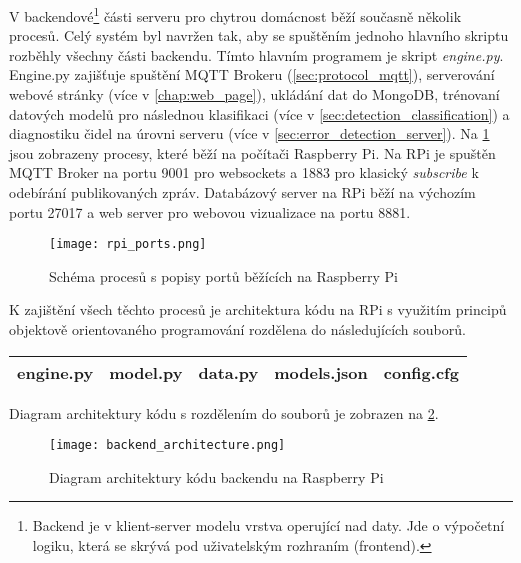 V backendové\footnote{Backend je v klient-server modelu vrstva operující nad daty. Jde o výpočetní logiku, která se skrývá pod uživatelským rozhraním (frontend).} části serveru pro chytrou domácnost běží současně několik procesů. Celý systém byl navržen tak, aby se spuštěním jednoho hlavního skriptu rozběhly všechny části backendu. Tímto hlavním programem je skript \textit{engine.py}. Engine.py zajišťuje spuštění MQTT Brokeru (\cref{sec:protocol_mqtt}), serverování webové stránky (více v \cref{chap:web_page}), ukládání dat do MongoDB, trénovaní datových modelů pro následnou klasifikaci (více v \cref{sec:detection_classification}) a diagnostiku čidel na úrovni serveru (více v \cref{sec:error_detection_server}).  Na \cref{fig:rpi_ports} jsou zobrazeny procesy, které běží na počítači Raspberry Pi. Na RPi je spuštěn MQTT Broker na portu 9001 pro websockets a 1883 pro klasický \textit{subscribe} k odebírání publikovaných zpráv. Databázový server na RPi běží na výchozím portu 27017 a web server pro webovou vizualizace na portu 8881. 

\begin{figure}[H]
  \centering
  \texttt{[image: rpi\_ports.png]}
  \caption{Schéma procesů s popisy portů běžících na Raspberry Pi}
  \label{fig:rpi_ports}
\end{figure}

K zajištění všech těchto procesů je architektura kódu na RPi s využitím principů objektově orientovaného programování rozdělena do následujících souborů.

\begin{table}[h!]
\centering
\begin{tabular}{|c|c|c||c|c|} 
 \hline
 engine.py & model.py & data.py & models.json & config.cfg \\
 \hline
\end{tabular}
\end{table}

Diagram architektury kódu s rozdělením do souborů je zobrazen na \cref{fig:backend_architecture}.

\begin{figure}[H]
  \centering
  \texttt{[image: backend\_architecture.png]}
  \caption{Diagram architektury kódu backendu na Raspberry Pi}
  \label{fig:backend_architecture}
\end{figure}

